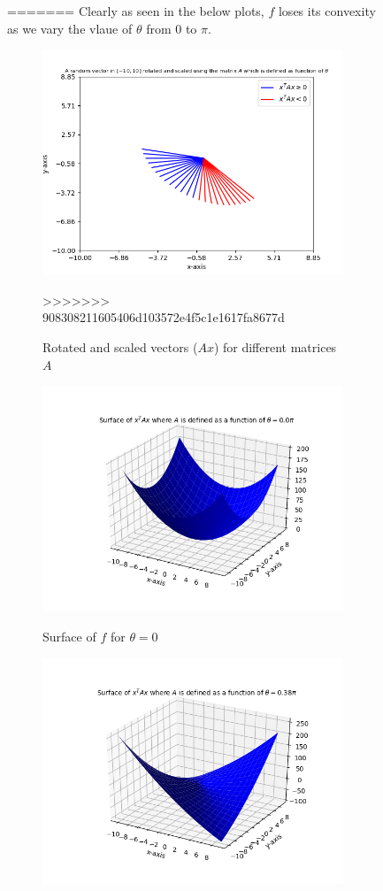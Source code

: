 \documentclass{article}
\begin{document}
\begin{flushleft}
\begin{figure}[htp]
=======
Clearly as seen in the below plots, $f$ loses its convexity as we vary the vlaue of $\theta$ from $0$ to $\pi$.\\
\begin{figure}[htp]
        \centering
        \includegraphics[width=9cm]{psd.png}\\
        \caption{Rotated and scaled vectors ($Ax$) for different matrices $A$}
>>>>>>> 908308211605406d103572e4f5c1e1617fa8677d
\end{figure}
\begin{figure}[htp]
        \centering
        \includegraphics[width=9cm]{0pi.png}\\
        \caption{Surface of $f$ for $\theta=0$}
\end{figure}
\begin{figure}[htp]
        \centering
        \includegraphics[width=9cm]{38pi.png}\\

\end{figure}
\end{figure}
\end{flushleft}
\end{document}
